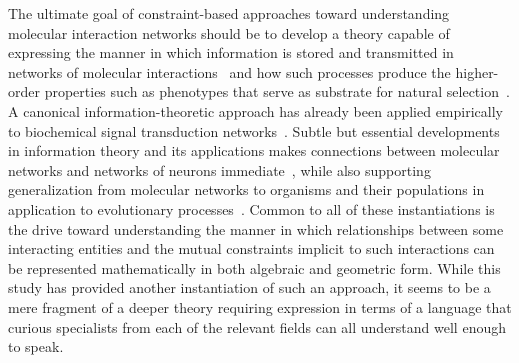 The ultimate goal of constraint-based approaches toward understanding molecular interaction networks should be to develop a theory capable of expressing the manner in which information is stored and transmitted in networks of molecular interactions~\cite{Tkacik2011a,Bialek2012} and how such processes produce the higher-order properties such as phenotypes that serve as substrate for natural selection~\cite{Mora2013}. A canonical information-theoretic approach has already been applied empirically to biochemical signal transduction networks~\cite{Cheong2011,Brennan2012}. Subtle but essential developments in information theory and its applications makes connections between molecular networks and networks of neurons immediate~\cite{Stanley1999,Balduzzi2008,Balduzzi2009,Balduzzi2012}, while also supporting generalization from molecular networks to organisms and their populations in application to evolutionary processes~\cite{Kussell2005a,Rivoire2011}. Common to all of these instantiations is the drive toward understanding the manner in which relationships between some interacting entities and the mutual constraints implicit to such interactions can be represented mathematically in both algebraic and geometric form. While this study has provided another instantiation of such an approach, it seems to be a mere fragment of a deeper theory requiring expression in terms of a language that curious specialists from each of the relevant fields can all understand well enough to speak.
